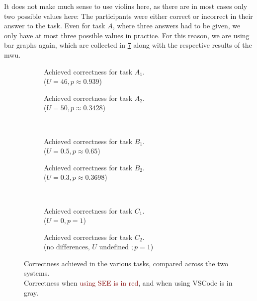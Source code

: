 \documentclass[../thesis]{subfiles}
\begin{document}
It does not make much sense to use \glspl{violin} here, as there are in most cases only two possible values here:
The participants were either correct or incorrect in their answer to the task.
Even for task $A$, where three answers had to be given, we only have at most three possible values in practice.
For this reason, we are using bar graphs again, which are collected in \cref{fig:correctness} along with the respective results of the \gls{mwu}.

\begin{figure}
	\begin{subfigure}[T]{0.5\textwidth}
		\caption{Achieved correctness for task $A_1$.\\
			($U = 46, p \approx 0.939$)
			\label{fig:a1c}}
	\end{subfigure}\hfill
	\begin{subfigure}[T]{0.5\textwidth}
		\caption{Achieved correctness for task $A_2$.\\
			($U = 50, p \approx 0.3428$)\label{fig:a2c}}
	\end{subfigure}\\
	\begin{subfigure}[T]{0.5\textwidth}
		\caption{Achieved correctness for task $B_1$.\\
			($U = 0.5, p \approx 0.65$)\label{fig:b1c}}
	\end{subfigure}\hfill
	\begin{subfigure}[T]{0.5\textwidth}
		\caption{Achieved correctness for task $B_2$.\\
			($U = 0.3, p \approx 0.3698$)\label{fig:b2c}}
	\end{subfigure}\\
	\begin{subfigure}[T]{0.5\textwidth}
		\caption{Achieved correctness for task $C_1$.\\
			($U = 0, p = 1$)\label{fig:c1c}}
	\end{subfigure}\hfill
	\begin{subfigure}[T]{0.5\textwidth}
		\caption{Achieved correctness for task $C_2$.\\
			($\text{no differences, } U \text{ undefined }; p = 1$)\label{fig:c2c}}
	\end{subfigure}
	\caption{Correctness achieved in the various tasks, compared across the two systems.\\
		Correctness when \textcolor{Maroon}{using SEE is in red}, and when \textcolor{Gray!50!black}{using VSCode is in gray}.}\label{fig:correctness}
\end{figure}
\end{document}
